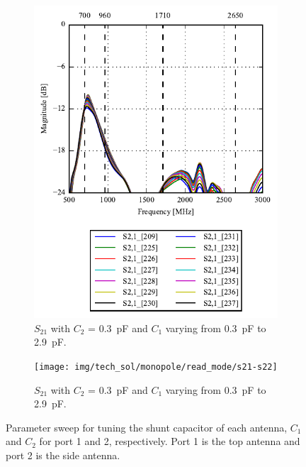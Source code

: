 \begin{figure}[htbp]
\begin{subfigure}[b]{0.49\linewidth}
        \includegraphics{img/tech_sol/monopole/read_mode/s21_s11}
        \caption{$S_{21}$ with $C_2$ = \SI{0.3}{pF} and $C_1$ varying from \SI{0.3}{pF} to \SI{2.9}{pF}.}
        \label{fig:ant1_s11}
    \end{subfigure}
    \hfill
    \begin{subfigure}[b]{0.49\linewidth}
        \centering
        \texttt{[image: img/tech\_sol/monopole/read\_mode/s21-s22]}
        \caption{$S_{21}$ with $C_2$ = \SI{0.3}{pF} and $C_1$ varying from \SI{0.3}{pF} to \SI{2.9}{pF}.}
        \label{fig:ant1_s22}
    \end{subfigure}
    \caption{Parameter sweep for tuning the shunt capacitor of each antenna, $C_1$ and $C_2$ for port 1 and 2, respectively. Port 1 is the top antenna and port 2 is the side antenna.}
    \label{fig:sparam_mono}
\end{figure}


